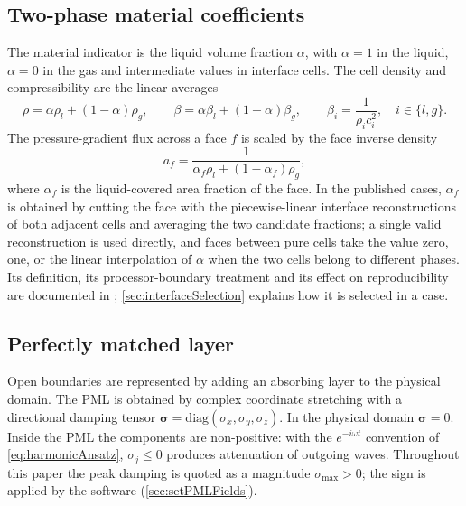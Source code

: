 \documentclass[final,12pt,nopreprintline]{elsarticle}
\begin{document}
\subsection{Two-phase material coefficients}
\label{sec:material}

The material indicator is the liquid volume fraction $\alpha$, with $\alpha=1$
in the liquid, $\alpha=0$ in the gas and intermediate values in interface
cells.  The cell density and compressibility are the linear averages
\begin{equation}
    \rho = \alpha\rho_l + (1-\alpha)\rho_g,
    \qquad
    \beta = \alpha\beta_l + (1-\alpha)\beta_g,
    \qquad
    \beta_i = \frac{1}{\rho_i c_i^2},\quad i\in\{l,g\}.
    \label{eq:materialAverages}
\end{equation}
The pressure-gradient flux across a face $f$ is scaled by the face inverse
density
\begin{equation}
    a_f = \frac{1}{\alpha_f\rho_l+(1-\alpha_f)\rho_g},
    \label{eq:faceInverseDensity}
\end{equation}
where $\alpha_f$ is the liquid-covered area fraction of the face.  In the
published cases, $\alpha_f$ is obtained by cutting the face with the
piecewise-linear interface reconstructions of both adjacent cells and averaging
the two candidate fractions; a single valid reconstruction is used directly,
and faces between pure cells take the value zero, one, or the linear
interpolation of $\alpha$ when the two cells belong to different phases.  Its
definition, its processor-boundary treatment and its effect on reproducibility
are documented in \cite{Xu2026HelmholtzPML}; \cref{sec:interfaceSelection}
explains how it is selected in a case.

\subsection{Perfectly matched layer}
\label{sec:pml}

Open boundaries are represented by adding an absorbing layer to the physical
domain.  The PML is obtained by complex coordinate stretching with a
directional damping tensor $\boldsymbol{\sigma}=\mathrm{diag}(\sigma_x,\sigma_y,\sigma_z)$.
In the physical domain $\boldsymbol{\sigma}=0$.  Inside the PML the
components are non-positive: with the $e^{-i\omega t}$ convention of
\cref{eq:harmonicAnsatz}, $\sigma_j\le 0$ produces attenuation of outgoing
waves.  Throughout this paper the peak damping is quoted as a magnitude
$\sigma_{\max}>0$; the sign is applied by the software
(\cref{sec:setPMLFields}).
\end{document}
